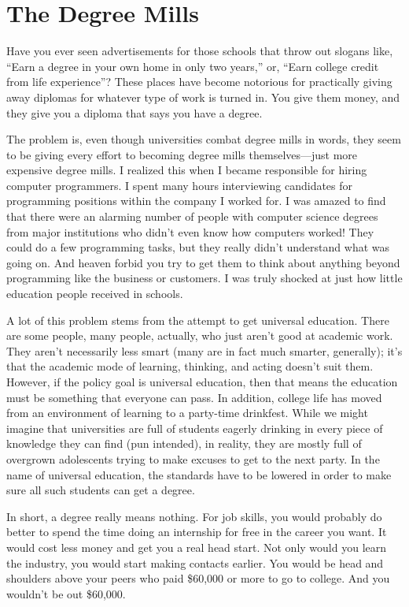 \section{The Degree Mills}

Have you ever seen advertisements for those
schools that throw out
slogans like, “Earn a degree in your own home in only two years,” or,
“Earn college credit from life experience”?  These places have become
notorious for practically giving away diplomas for whatever type of
work is turned in. You give them money, and they give you a diploma
that says you have a degree.

The problem is, even though universities combat degree mills in words,
they seem to be giving every effort to becoming degree mills
themselves—just more expensive degree mills. I realized this when I
became responsible for hiring computer programmers. I spent many hours
interviewing candidates for programming positions within the company I
worked for. I was amazed to find that there were an alarming number of
people with computer science degrees from major institutions who didn’t
even know how computers worked!  They could do a few programming tasks,
but they really didn’t understand what was going on. And heaven forbid
you try to get them to think about anything beyond programming like the
business or customers. I was truly shocked at just how little education
people received in schools.

A lot of this problem stems from the attempt to get universal education.
There are some people, many people, actually, who just aren’t good at
academic work. They aren’t necessarily less smart (many are in fact
much smarter, generally); it’s that the academic mode of learning,
thinking, and acting doesn’t suit them. However, if the policy goal is
universal education, then that means the education must be something
that everyone can pass. In addition, college life has moved from an
environment of learning to a party-time drinkfest. While we might
imagine that universities are full of students eagerly drinking in
every piece of knowledge they can find
(pun intended), in
reality, they are
mostly full of overgrown adolescents trying to make excuses to get to
the next party. In the name of universal education, the standards have
to be lowered in order to make sure all such students can get a
degree.

In short, a degree really means nothing. For job skills, you would
probably do better to spend the time doing an internship for free in
the career you want. It would cost less money and get you a real head
start. Not only would you learn the industry, you would start making
contacts earlier. You would be head and shoulders above your peers who
paid \$60,000 or more to go to college.  And you
wouldn't be out \$60,000.

